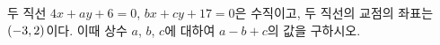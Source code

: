 두 직선 $4x+ay+6=0$, $bx+cy+17=0$은 수직이고, 두 직선의 교점의 좌표는 $(-3{,}\mkern3mu\mathopen{}2)$이다. 이때 상수 $a$, $b$, $c$에 대하여 $a-b+c$의 값을 구하시오.
